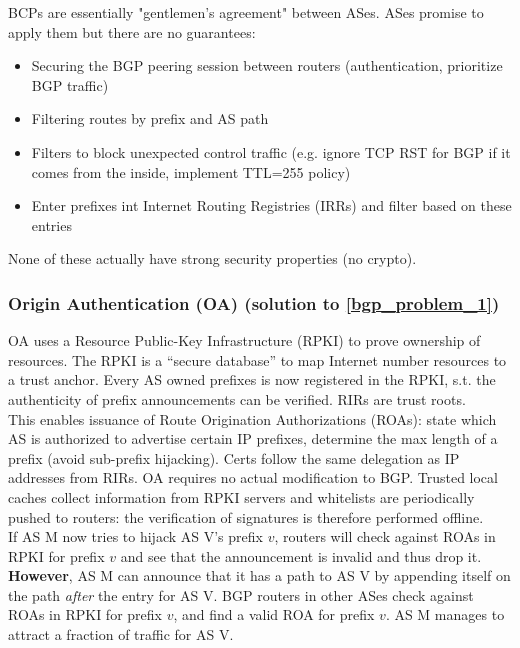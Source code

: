 \documentclass[11pt,oneside,a4paper]{article}
\begin{document}
BCPs are essentially "gentlemen's agreement" between ASes. ASes promise to apply them but there are no guarantees:

\vspace{-\topsep}
\begin{itemize}
	\setlength{\itemsep}{0pt}
	\setlength{\parskip}{0pt}
	\item Securing the BGP peering session between routers (authentication, prioritize BGP traffic)
	\item Filtering routes by prefix and AS path
	\item Filters to block unexpected control traffic (e.g. ignore TCP RST for BGP if it comes from the inside, implement TTL=255 policy)
	\item Enter prefixes int Internet Routing Registries (IRRs) and filter based on these entries
\end{itemize}
\vspace{-\topsep}

\noindent None of these actually have strong security properties (no crypto).

\subsubsection{Origin Authentication (OA) (solution to \ref{bgp_problem_1})}

OA uses a Resource Public-Key Infrastructure (RPKI) to prove ownership of resources. The RPKI is a “secure database” to map Internet number resources to a trust anchor. Every AS owned prefixes is now registered in the RPKI, s.t. the authenticity of prefix announcements can be verified. 
RIRs are trust roots.\\
This enables issuance of Route Origination Authorizations (ROAs): state which AS is authorized to advertise certain IP prefixes, determine the max length of a prefix (avoid sub-prefix hijacking). Certs follow the same delegation as IP addresses from RIRs. OA requires no actual modification to BGP. Trusted local caches collect information from RPKI servers and whitelists are periodically pushed to routers: the verification of signatures is therefore performed offline.\\

\noindent If AS M now tries to hijack AS V's prefix $v$, routers will check against ROAs in RPKI for prefix $v$ and see that the announcement is invalid and thus drop it.\\
\textbf{However}, AS M can announce that it has a path to AS V by appending itself on the path \textit{after} the entry for AS V. BGP routers in other ASes check against ROAs in RPKI for prefix $v$, and find a valid ROA for prefix $v$. AS M manages to attract a fraction of traffic for AS V.
\end{document}

